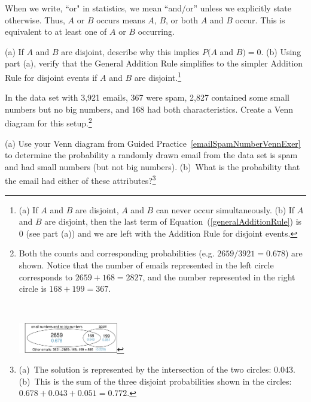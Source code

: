 \begin{tipBox}{
When we write, ``or"  in statistics, we mean ``and/or'' unless we explicitly state otherwise. Thus, $A$ or $B$ occurs means $A$, $B$, or both $A$ and $B$ occur. This is equivalent to at least one of $A$ or $B$ occurring.}
\end{tipBox}

\begin{exercise}
(a) If $A$ and $B$ are disjoint, describe why this implies $P(A$ and $B) = 0$. (b) Using part (a), verify that the General Addition Rule simplifies to the simpler Addition Rule for disjoint events if $A$ and $B$ are disjoint.\footnote{(a) If $A$ and $B$ are disjoint, $A$ and $B$ can never occur simultaneously. (b) If $A$ and $B$ are disjoint, then the last term of Equation~(\ref{generalAdditionRule}) is 0 (see part (a)) and we are left with the Addition Rule for disjoint events.}
\end{exercise}


\begin{exercise}\label{emailSpamNumberVennExer}
In the  data set with 3,921 emails, 367 were spam, 2,827 contained some small numbers but no big numbers, and 168 had both characteristics. Create a Venn diagram for this setup.\footnote{%
\begin{minipage}[t]{0.65\textwidth}
Both the counts and corresponding {\color{oiB}probabilities} (e.g. $2659/3921 = 0.678$) are shown. Notice that the number of emails represented in the left circle corresponds to $2659 + 168 = 2827$, and the number represented in the right circle is $168 + 199 = 367$.
\end{minipage}\ %
\begin{minipage}[c]{0.3\textwidth}
\hfill\includegraphics[height=13mm]{ch_probability/figures/emailSpamNumberVenn/emailSpamNumberVenn} \vspace{-13mm}
\end{minipage}
}
\end{exercise}

\begin{exercise}
(a) Use your Venn diagram from Guided Practice~\ref{emailSpamNumberVennExer} to determine the probability a randomly drawn email from the  data set is spam and had small numbers (but not big numbers). (b)~What is the probability that the email had either of these attributes?\footnote{(a)~The solution is represented by the intersection of the two circles: 0.043. (b)~This is the sum of the three disjoint probabilities shown in the circles: $0.678 + 0.043 + 0.051 = 0.772$.}
\end{exercise}


